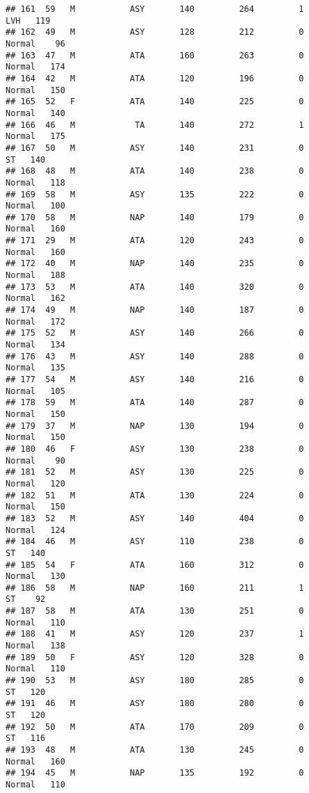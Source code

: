 \documentclass[
]{article}
\begin{document}
\begin{verbatim}
## 161  59   M           ASY       140         264         1        LVH   119
## 162  49   M           ASY       128         212         0     Normal    96
## 163  47   M           ATA       160         263         0     Normal   174
## 164  42   M           ATA       120         196         0     Normal   150
## 165  52   F           ATA       140         225         0     Normal   140
## 166  46   M            TA       140         272         1     Normal   175
## 167  50   M           ASY       140         231         0         ST   140
## 168  48   M           ATA       140         238         0     Normal   118
## 169  58   M           ASY       135         222         0     Normal   100
## 170  58   M           NAP       140         179         0     Normal   160
## 171  29   M           ATA       120         243         0     Normal   160
## 172  40   M           NAP       140         235         0     Normal   188
## 173  53   M           ATA       140         320         0     Normal   162
## 174  49   M           NAP       140         187         0     Normal   172
## 175  52   M           ASY       140         266         0     Normal   134
## 176  43   M           ASY       140         288         0     Normal   135
## 177  54   M           ASY       140         216         0     Normal   105
## 178  59   M           ATA       140         287         0     Normal   150
## 179  37   M           NAP       130         194         0     Normal   150
## 180  46   F           ASY       130         238         0     Normal    90
## 181  52   M           ASY       130         225         0     Normal   120
## 182  51   M           ATA       130         224         0     Normal   150
## 183  52   M           ASY       140         404         0     Normal   124
## 184  46   M           ASY       110         238         0         ST   140
## 185  54   F           ATA       160         312         0     Normal   130
## 186  58   M           NAP       160         211         1         ST    92
## 187  58   M           ATA       130         251         0     Normal   110
## 188  41   M           ASY       120         237         1     Normal   138
## 189  50   F           ASY       120         328         0     Normal   110
## 190  53   M           ASY       180         285         0         ST   120
## 191  46   M           ASY       180         280         0         ST   120
## 192  50   M           ATA       170         209         0         ST   116
## 193  48   M           ATA       130         245         0     Normal   160
## 194  45   M           NAP       135         192         0     Normal   110

\end{verbatim}
\end{document}
